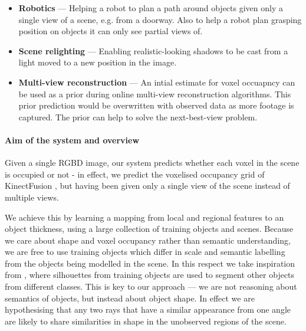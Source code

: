 \documentclass[10pt,twocolumn,letterpaper]{article}
\makeatletter
\renewcommand*{\eg}{e.g.\@\xspace}
\newcommand*{\ea}{et al.\@\xspace}
\makeatother
\begin{document}
\begin{itemize}
\item \textbf{Robotics} --- Helping a robot to plan a path around objects given only a single view of a scene, e.g. from a doorway. Also to help a robot plan grasping position on objects it can only see partial views of.
\item \textbf{Scene relighting} --- Enabling realistic-looking shadows to be cast from a light moved to a new position in the image.
\item \textbf{Multi-view reconstruction} --- An intial estimate for voxel occuapncy can be used as a prior during online multi-view reconstruction algorithms. This prior prediction would be overwritten with observed data as more footage is captured. The prior can help to solve the next-best-view problem.
\end{itemize}

\paragraph{Aim of the system and overview}
Given a single RGBD image, our system predicts whether each voxel in the scene is occupied or not - in effect, we predict the voxelised occupancy grid of KinectFusion \cite{izadi-uist-2011}, but having been given only a single view of the scene instead of multiple views.

We achieve this by learning a mapping from local and regional features to an object thickness, using a large collection of training objects and scenes.
Because we care about shape and voxel occupancy rather than semantic understanding, we are free to use training objects which differ in scale and semantic labelling from the objects being modelled in the scene.
In this respect we take inspiration from \cite{kim-eccv-2012}, where silhouettes from training objects are used to segment other objects from different classes.
This is key to our approach --- we are not reasoning about semantics of objects, but instead about object shape.
In effect we are hypothesising that any two rays that have a similar appearance from one angle are likely to share similarities in shape in the unobserved regions of the scene.
\end{document}

